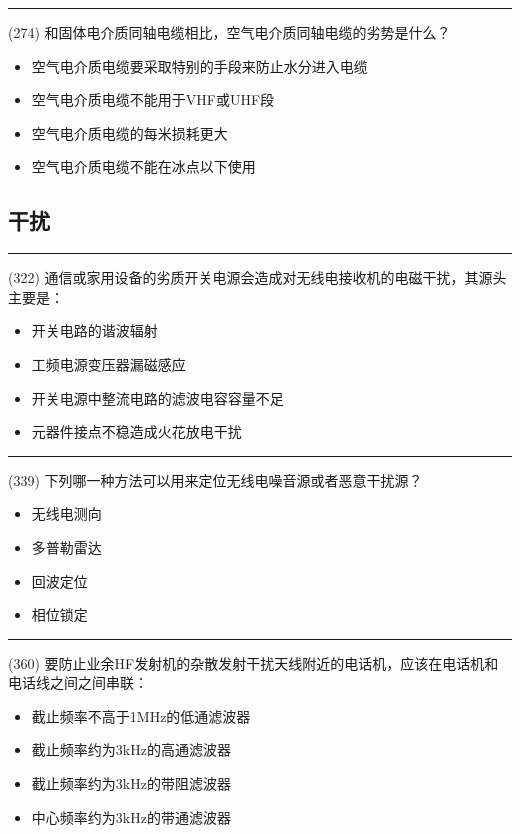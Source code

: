 \documentclass[twocolumn,hyperref,UTF8]{ctexart}  %
\begin{document}
\noindent\rule{0.5\textwidth}{1pt}
\heiti (274) 和固体电介质同轴电缆相比，空气电介质同轴电缆的劣势是什么？ \songti {\color{gray} [LK1191] }
\begin{itemize}
	\item  空气电介质电缆要采取特别的手段来防止水分进入电缆
	\item  空气电介质电缆不能用于VHF或UHF段
	\item  空气电介质电缆的每米损耗更大
	\item  空气电介质电缆不能在冰点以下使用
\end{itemize}



\clearpage
\subsection{干扰}





\noindent\rule{0.5\textwidth}{1pt}
\heiti (322) 通信或家用设备的劣质开关电源会造成对无线电接收机的电磁干扰，其源头主要是： \songti {\color{gray} [LK0691] }
\begin{itemize}
	\item  开关电路的谐波辐射
	\item  工频电源变压器漏磁感应
	\item  开关电源中整流电路的滤波电容容量不足
	\item  元器件接点不稳造成火花放电干扰
\end{itemize}


\noindent\rule{0.5\textwidth}{1pt}
\heiti (339) 下列哪一种方法可以用来定位无线电噪音源或者恶意干扰源？ \songti {\color{gray} [LK1206] }
\begin{itemize}
	\item  无线电测向
	\item  多普勒雷达
	\item  回波定位
	\item  相位锁定
\end{itemize}


\noindent\rule{0.5\textwidth}{1pt}
\heiti (360) 要防止业余HF发射机的杂散发射干扰天线附近的电话机，应该在电话机和电话线之间之间串联： \songti {\color{gray} [LK0575] }
\begin{itemize}
	\item  截止频率不高于1MHz的低通滤波器
	\item  截止频率约为3kHz的高通滤波器
	\item  截止频率约为3kHz的带阻滤波器
	\item  中心频率约为3kHz的带通滤波器
\end{itemize}
\end{document}
